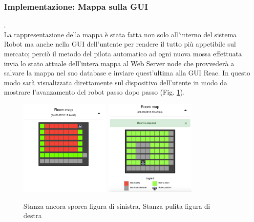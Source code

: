 \documentclass{llncs}
\begin{document}
\subsubsection{Implementazione: Mappa sulla GUI}.
\label{ImplementazioneMappaGUIReq5}
\vspace*{1ex}
\\
La rappresentazione della mappa \`e stata fatta non solo all'interno del sistema Robot ma anche nella GUI dell'untente per rendere il tutto pi\`u appetibile sul mercato; perci\`o il metodo del pilota automatico ad ogni nuova mossa effettuata invia lo stato attuale dell'intera mappa al Web Server node che provveder\`a a salvare la mappa nel suo database e inviare quest'ultima alla GUI Reac. In questo modo sar\`a visualizzata direttamente sul dispositivo dell'utente in modo da mostrare l'avanzamento del robot passo dopo passo (Fig. \hyperref[fig:R5GUIMAP]{\ref{fig:R5GUIMAP}}).
\begin{figure}
    \centering
    \includegraphics[width=0.4\textwidth]{Immagini/Requisito5/MapDirty.png}
    \includegraphics[width=0.4\textwidth]{Immagini/Requisito5/MapClean.png}
    \caption{Stanza ancora sporca figura di sinistra, Stanza pulita figura di destra}
    \label{fig:R5GUIMAP}
\end{figure}
\pagebreak

\end{document}
